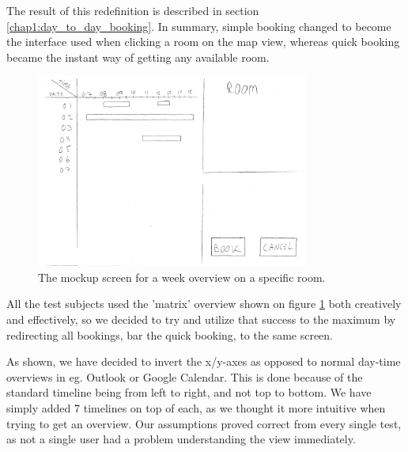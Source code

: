 The result of this redefinition is described in section \ref{chap1:day_to_day_booking}. In summary, simple booking changed to become the interface used when clicking a room on the map view, whereas quick booking became the instant way of getting any available room.

\pagebreak
\begin{figure}[htb]
\begin{center}
\leavevmode
\includegraphics[width=0.8\textwidth]{images/weekMockup}
\end{center}
\caption{The mockup screen for a week overview on a specific room.}
\label{fig:week_mockup}
\end{figure}

All the test subjects used the 'matrix' overview shown on figure \ref{fig:week_mockup} both creatively and effectively, so we decided to try and utilize that success to the maximum by redirecting all bookings, bar the quick booking, to the same screen.

As shown, we have decided to invert the x/y-axes as opposed to normal day-time overviews in eg. Outlook or Google Calendar. This is done because of the standard timeline being from left to right, and not top to bottom. We have simply added 7 timelines on top of each, as we thought it more intuitive when trying to get an overview. Our assumptions proved correct from every single test, as not a single user had a problem understanding the view immediately.

